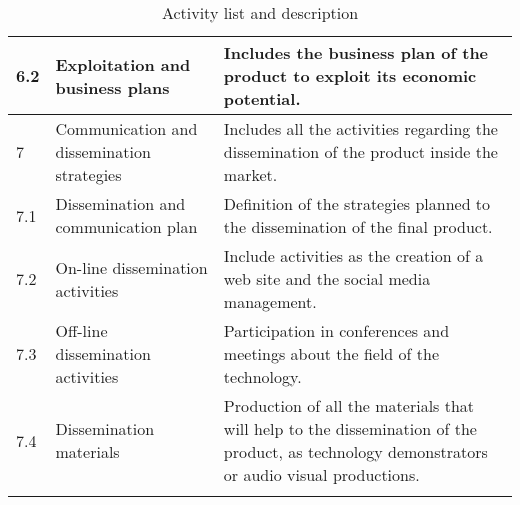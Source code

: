 \begin{longtable}[H]{p{1.5cm} >{\raggedright\arraybackslash}p{4cm} p{8cm}}
	\midrule
	
	6.2 & Exploitation and business plans & Includes the business plan of the product to exploit its economic potential.\vspace{0.2cm} \\
	
	\midrule
	
	7 & Communication and dissemination strategies & Includes all the activities regarding the dissemination of the product inside the market.\vspace{0.2cm} \\
	
	\midrule
	
	7.1 & Dissemination and communication plan & Definition of the strategies planned to the dissemination of the final product.\vspace{0.2cm} \\
	
	\midrule
	
	7.2 & On-line dissemination activities & Include activities as the creation of a web site and the social media management.\vspace{0.2cm} \\
	
	\midrule
	
	7.3 & Off-line dissemination activities & Participation in conferences and meetings about the field of the technology.\vspace{0.2cm} \\
	
	\midrule
	
	7.4 & Dissemination materials & Production of all the materials that will help to the dissemination of the product, as technology demonstrators or audio visual productions.\vspace{0.2cm} \\
	
	\bottomrule[2pt]
	
	\caption{Activity list and description}
\end{longtable}